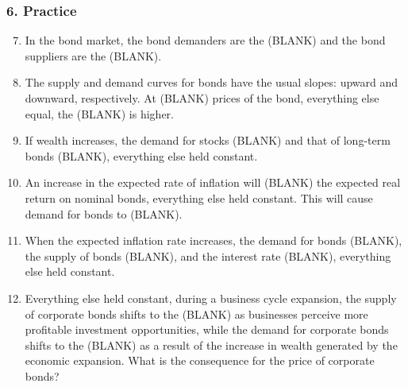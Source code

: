 \documentclass{beamer}
\begin{document}
\begin{practiceframe}
    \frametitle{6. Practice}

\begin{enumerate}
        \setcounter{enumi}{6}
        \item In the bond market, the bond demanders are the (BLANK) and the bond suppliers are the (BLANK).
        \item The supply and demand curves for bonds have the usual slopes: upward and downward, respectively.  At (BLANK) prices of the bond, everything else equal, the (BLANK) is higher.
        \item If wealth increases, the demand for stocks (BLANK) and that of long-term bonds (BLANK), everything else held constant.
        \item An increase in the expected rate of inflation will (BLANK) the expected real return on nominal bonds, everything else held constant.   This will cause demand for bonds to (BLANK).
        \item When the expected inflation rate increases, the demand for bonds (BLANK), the supply of bonds (BLANK), and the interest rate (BLANK), everything else held constant.
        \item Everything else held constant, during a business cycle expansion, the supply of corporate bonds shifts to the (BLANK) as businesses perceive more profitable investment opportunities, while the demand for corporate bonds shifts to the (BLANK) as a result of the increase in wealth generated by the economic expansion.   What is the consequence for the price of corporate bonds?

    \end{enumerate}




\end{practiceframe}
\end{document}
